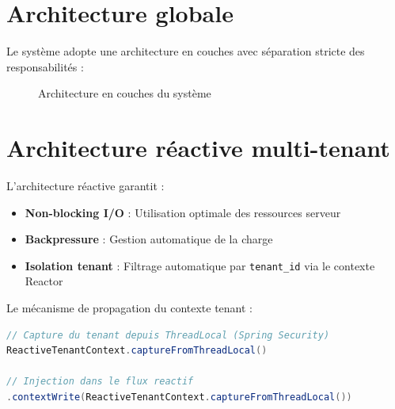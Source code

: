 \documentclass[12pt]{report}
\begin{document}
\section{Architecture globale}
Le système adopte une architecture en couches avec séparation stricte des responsabilités :

\begin{figure}[H]
\centering
{}
\caption{Architecture en couches du système}
\label{fig:architecture}
\end{figure}

\section{Architecture réactive multi-tenant}
L'architecture réactive garantit :
\begin{itemize}
    \item \textbf{Non-blocking I/O} : Utilisation optimale des ressources serveur
    \item \textbf{Backpressure} : Gestion automatique de la charge
    \item \textbf{Isolation tenant} : Filtrage automatique par \texttt{tenant\_id} via le contexte Reactor
\end{itemize}

Le mécanisme de propagation du contexte tenant :
\begin{lstlisting}[language=Java, caption=Propagation du contexte tenant]
// Capture du tenant depuis ThreadLocal (Spring Security)
ReactiveTenantContext.captureFromThreadLocal()

// Injection dans le flux reactif
.contextWrite(ReactiveTenantContext.captureFromThreadLocal())
\end{lstlisting}
\end{document}
